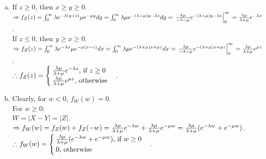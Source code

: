 \begin{pr}$ $
\begin{enumerate}[(a)]
\item If $z\geq0$, then $x\geq y\geq0$.\\
$\Rightarrow f_Z(z)=\int_0^\infty\lambda e^{-\lambda(y+z)}\mu e^{-\mu y}dy\\
=\int_0^\infty\lambda\mu e^{-(\lambda+\mu)y-\lambda z}dy\\
=\left.\frac{\lambda\mu}{-\lambda-\mu}e^{-(\lambda+\mu)y-\lambda z}\right|_0^\infty\\
=\frac{\lambda\mu}{\lambda+\mu}e^{-\lambda z}$.\\
If $z\leq0$, then $y\geq x\geq0$.\\
$\Rightarrow f_Z(z)=\int_0^\infty\lambda e^{-\lambda x}\mu e^{-\mu(x-z)}dx\\
=\int_0^\infty\lambda\mu e^{-(\lambda+\mu)x+\mu z}dx\\
=\left.\frac{\lambda\mu}{-\lambda-\mu}e^{-(\lambda+\mu)x+\mu z}\right|_0^\infty\\
=\frac{\lambda\mu}{\lambda+\mu}e^{\mu z}$.\\
$\therefore f_Z(z)=\begin{cases}
\frac{\lambda\mu}{\lambda+\mu}e^{-\lambda z}\text{, if }z\geq0\\
\frac{\lambda\mu}{\lambda+\mu}e^{\mu z}\text{, otherwise}
\end{cases}$.
\item Clearly, for $w<0$, $f_W(w)=0$.\\
For $w\geq0$:\\
$W=|X-Y|=|Z|$.\\
$\Rightarrow f_W(w)=f_Z(w)+f_Z(-w)=\frac{\lambda\mu}{\lambda+\mu}e^{-\lambda w}+\frac{\lambda\mu}{\lambda+\mu}e^{-\mu w}=\frac{\lambda\mu}{\lambda+\mu}(e^{-\lambda w}+e^{-\mu w})$.\\
$\therefore f_W(w)=\begin{cases}
\frac{\lambda\mu}{\lambda+\mu}(e^{-\lambda w}+e^{-\mu w})\text{, if }w\geq0\\
0\text{, otherwise}
\end{cases}$.
\end{enumerate}
\end{pr}

